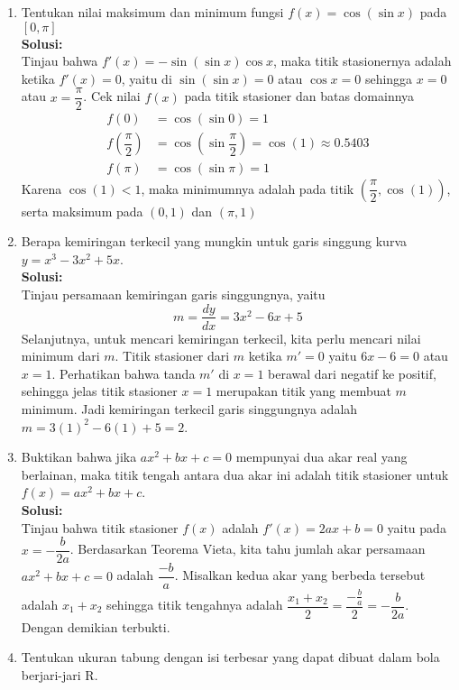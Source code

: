 \documentclass{article}
\begin{document}
\begin{enumerate}
\begin{center}
	\end{center}\newpage
	\item Tentukan nilai maksimum dan minimum fungsi $f(x)=\cos(\sin x)$ pada $[0,\pi]$
	\\[0.1 cm] \textbf{Solusi:}\\
	Tinjau bahwa $f'(x)=-\sin(\sin x)\cos x$, maka titik stasionernya adalah ketika $f'(x)=0$, yaitu di $\sin(\sin x)=0$ atau $\cos x=0$ sehingga $x=0$ atau $x=\dfrac{\pi}{2}$. Cek nilai $f(x)$ pada titik stasioner dan batas domainnya
	\begin{align*}
	f(0) &=\cos(\sin 0) = 1\\
	f\left(\dfrac{\pi}{2}\right) &= \cos\left(\sin \dfrac{\pi}{2}\right) = \cos(1) \approx 0.5403\\
	f(\pi) &= \cos(\sin \pi) = 1
	\end{align*}
	Karena $\cos(1)<1$, maka minimumnya adalah pada titik $\left(\dfrac{\pi}{2},\cos(1)\right)$, serta maksimum pada $(0,1)$ dan $(\pi,1)$
	\item Berapa kemiringan terkecil yang mungkin untuk garis singgung kurva $y=x^3-3x^2+5x$.
	\\[0.1 cm] \textbf{Solusi:}\\
	Tinjau persamaan kemiringan garis singgungnya, yaitu 
	$$ m=\dfrac{dy}{dx} = 3x^2-6x+5$$
	Selanjutnya, untuk mencari kemiringan terkecil, kita perlu mencari nilai minimum dari $m$. Titik stasioner dari $m$ ketika $m'=0$ yaitu $6x-6=0$ atau $x=1$. Perhatikan bahwa tanda $m'$ di $x=1$ berawal dari negatif ke positif, sehingga jelas titik stasioner $x=1$ merupakan titik yang membuat $m$ minimum. Jadi kemiringan terkecil garis singgungnya adalah $m=3(1)^2-6(1)+5=2$.  
	\item Buktikan bahwa jika $ax^2+bx+c=0$ mempunyai dua akar real yang berlainan, maka titik tengah antara dua akar ini adalah titik stasioner untuk $f(x)=ax^2+bx+c$.
	\\[0.1 cm] \textbf{Solusi:}\\
	Tinjau bahwa titik stasioner $f(x)$ adalah $f'(x)=2ax+b=0$ yaitu pada $x=-\dfrac{b}{2a}$. Berdasarkan Teorema Vieta, kita tahu jumlah akar persamaan $ax^2+bx+c=0$ adalah $\dfrac{-b}{a}$. Misalkan kedua akar yang berbeda tersebut adalah $x_1+x_2$ sehingga titik tengahnya adalah $\dfrac{x_1+x_2}{2}=\dfrac{-\frac{b}{a}}{2}=-\dfrac{b}{2a}$. Dengan demikian terbukti.
	\item Tentukan ukuran tabung dengan isi terbesar yang dapat dibuat dalam bola berjari-jari R.

\end{enumerate}
\end{document}
